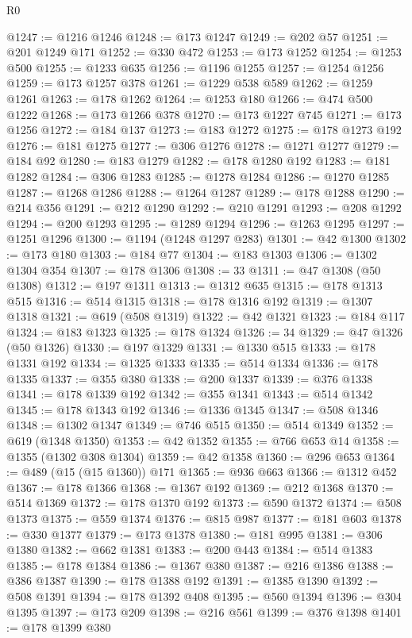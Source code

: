 \begin{lexlean}{R0}
\begin{coremodule}
@1247 := @1216 @1246
@1248 := @173 @1247
@1249 := @202 @57
@1251 := @201 @1249 @171
@1252 := @330 @472
@1253 := @173 @1252
@1254 := @1253 @500
@1255 := @1233 @635
@1256 := @1196 @1255
@1257 := @1254 @1256
@1259 := @173 @1257 @378
@1261 := @1229 @538 @589
@1262 := @1259 @1261
@1263 := @178 @1262
@1264 := @1253 @180
@1266 := @474 @500 @1222
@1268 := @173 @1266 @378
@1270 := @173 @1227 @745
@1271 := @173 @1256
@1272 := @184 @137
@1273 := @183 @1272
@1275 := @178 @1273 @192
@1276 := @181 @1275
@1277 := @306 @1276
@1278 := @1271 @1277
@1279 := @184 @92
@1280 := @183 @1279
@1282 := @178 @1280 @192
@1283 := @181 @1282
@1284 := @306 @1283
@1285 := @1278 @1284
@1286 := @1270 @1285
@1287 := @1268 @1286
@1288 := @1264 @1287
@1289 := @178 @1288
@1290 := @214 @356
@1291 := @212 @1290
@1292 := @210 @1291
@1293 := @208 @1292
@1294 := @200 @1293
@1295 := @1289 @1294
@1296 := @1263 @1295
@1297 := @1251 @1296
@1300 := @1194 (@1248 @1297 @283)
@1301 := @42 @1300
@1302 := @173 @180
@1303 := @184 @77
@1304 := @183 @1303
@1306 := @1302 @1304 @354
@1307 := @178 @1306
@1308 := 33
@1311 := @47 @1308 (@50 @1308)
@1312 := @197 @1311
@1313 := @1312 @635
@1315 := @178 @1313 @515
@1316 := @514 @1315
@1318 := @178 @1316 @192
@1319 := @1307 @1318
@1321 := @619 (@508 @1319)
@1322 := @42 @1321
@1323 := @184 @117
@1324 := @183 @1323
@1325 := @178 @1324
@1326 := 34
@1329 := @47 @1326 (@50 @1326)
@1330 := @197 @1329
@1331 := @1330 @515
@1333 := @178 @1331 @192
@1334 := @1325 @1333
@1335 := @514 @1334
@1336 := @178 @1335
@1337 := @355 @380
@1338 := @200 @1337
@1339 := @376 @1338
@1341 := @178 @1339 @192
@1342 := @355 @1341
@1343 := @514 @1342
@1345 := @178 @1343 @192
@1346 := @1336 @1345
@1347 := @508 @1346
@1348 := @1302 @1347
@1349 := @746 @515
@1350 := @514 @1349
@1352 := @619 (@1348 @1350)
@1353 := @42 @1352
@1355 := @766 @653 @14
@1358 := @1355 (@1302 @308 @1304)
@1359 := @42 @1358
@1360 := @296 @653
@1364 := @489 (@15 (@15 @1360)) @171
@1365 := @936 @663
@1366 := @1312 @452
@1367 := @178 @1366
@1368 := @1367 @192
@1369 := @212 @1368
@1370 := @514 @1369
@1372 := @178 @1370 @192
@1373 := @590 @1372
@1374 := @508 @1373
@1375 := @559 @1374
@1376 := @815 @987
@1377 := @181 @603
@1378 := @330 @1377
@1379 := @173 @1378
@1380 := @181 @995
@1381 := @306 @1380
@1382 := @662 @1381
@1383 := @200 @443
@1384 := @514 @1383
@1385 := @178 @1384
@1386 := @1367 @380
@1387 := @216 @1386
@1388 := @386 @1387
@1390 := @178 @1388 @192
@1391 := @1385 @1390
@1392 := @508 @1391
@1394 := @178 @1392 @408
@1395 := @560 @1394
@1396 := @304 @1395
@1397 := @173 @209
@1398 := @216 @561
@1399 := @376 @1398
@1401 := @178 @1399 @380

\end{coremodule}
\end{lexlean}
